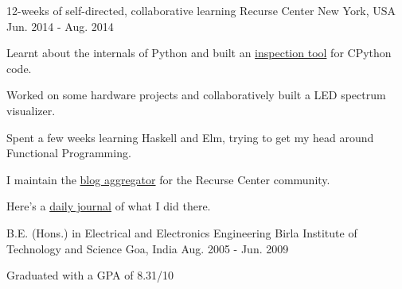 

\begin{cventries}

  \cventry
      {12-weeks of self-directed, collaborative learning}
      {Recurse Center}
      {New York, USA} %
      {Jun. 2014 - Aug. 2014} %
      {
        \begin{cvitems} %
        \item {Learnt about the internals of Python and built an \href{https://github.com/punchagan/cinspect}{inspection tool} for CPython code.}
        \item {Worked on some hardware projects and collaboratively built a LED spectrum visualizer.}
        \item {Spent a few weeks learning Haskell and Elm, trying to get my head around Functional Programming.}
        \item {I maintain the \href{https://github.com/recursecenter/blaggregator/commits?author=punchagan}{blog aggregator} for the Recurse Center community.}
        \item {Here’s a \href{https://punchagan.muse-amuse.in/recurse-center/}{daily journal} of what I did there.}
        \end{cvitems}
      }
  \cventry
      {B.E. (Hons.) in Electrical and Electronics Engineering} %
      {Birla Institute of Technology and Science} %
      {Goa, India} %
      {Aug. 2005 - Jun. 2009} %
      {
        \begin{cvitems} %
        \item {Graduated with a GPA of 8.31/10}
        \end{cvitems}
      }
\end{cventries}
